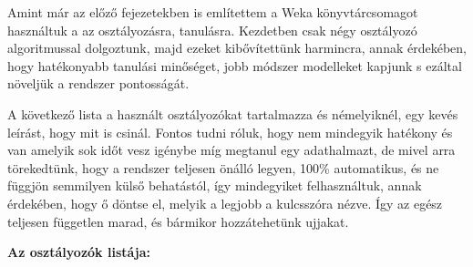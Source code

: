 \documentclass[12pt, a4paper, oneside]{book}
\theoremstyle{tetel}
\begin{document}
	Amint már az előző fejezetekben is említettem a Weka \cite{16} könyvtárcsomagot használtuk a az osztályozásra, tanulásra. Kezdetben csak négy osztályozó algoritmussal dolgoztunk, majd ezeket kibővítettünk harmincra, annak érdekében, hogy hatékonyabb tanulási minőséget, jobb módszer modelleket kapjunk s ezáltal növeljük a rendszer pontosságát. 

	A következő lista a használt osztályozókat tartalmazza és némelyiknél, egy kevés leírást, hogy mit is csinál. Fontos tudni róluk, hogy nem mindegyik hatékony és van amelyik sok időt vesz igénybe míg megtanul egy adathalmazt, de mivel arra törekedtünk, hogy a rendszer teljesen önálló legyen, 100\% automatikus, és ne függjön semmilyen külső behatástól, így mindegyiket felhasználtuk, annak érdekében, hogy ő döntse el, melyik a legjobb a kulcsszóra nézve. Így az egész teljesen független marad, és bármikor hozzátehetünk ujjakat.
\newline 
	
\textbf{Az osztályozók listája:}
\end{document}
